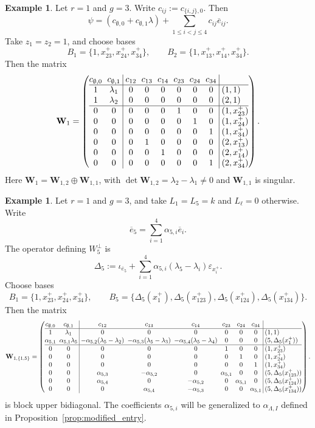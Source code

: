 \documentclass[12pt, letterpaper]{amsart}
\theoremstyle{definition}
\newtheorem{example}[theorem]{Example}
\newcommand{\bW}{\mathbf{W} }
\newcommand{\lbd}{\lambda}
\begin{document}
\begin{example}\label{ex:matrix_rank1_genus3}
Let \(r=1\) and \(g=3\). Write \(c_{ij}:=c_{\{i,j\},0}\). Then
\[\psi=(c_{\emptyset,0}+c_{\emptyset,1}\lbd)+\sum_{1\le i<j\le4}c_{ij}\overline e_{ij}.\]
Take \(z_1=z_2=1\), and choose bases
\[B_1=\{1,x_{23}^+,x_{24}^+,x_{34}^+\}, \qquad B_2=\{1,x_{13}^+,x_{14}^+,x_{34}^+\}.\]
Then the matrix
\[
\setlength{\arraycolsep}{3pt} \bW_1= \left( \begin{array}{@{}cc|cccccc|l@{}}
  c_{\emptyset,0}&c_{\emptyset,1}&c_{12}&c_{13}&c_{14}&c_{23}&c_{24}&c_{34}\\
  \hline 1&\lbd_1&0&0&0&0&0&0&(1,1)\\
  1&\lbd_2&0&0&0&0&0&0&(2,1)\\
  \hline 0&0&0&0&0&1&0&0&(1,x_{23}^+)\\
  0&0&0&0&0&0&1&0&(1,x_{24}^+)\\
  0&0&0&0&0&0&0&1&(1,x_{34}^+)\\
  0&0&0&1&0&0&0&0&(2,x_{13}^+)\\
  0&0&0&0&1&0&0&0&(2,x_{14}^+)\\
  0&0&0&0&0&0&0&1&(2,x_{34}^+)
\end{array}\right).
\]
Here \(\bW_1=\bW_{1,2}\oplus\bW_{1,1}\), with \(\det\bW_{1,2}=\lbd_2-\lbd_1\ne0\) and \(\bW_{1,1}\) is singular.
\end{example}

\begin{example}\label{ex:matrix_rank1_genus3_mixed}
Let \(r=1\) and \(g=3\), and take \(L_1=L_5=k\) and \(L_\ell=0\) otherwise. Write
\[\overline e_5=\sum_{i=1}^4\alpha_{5,i}\overline e_i.\]
The operator defining \(W_5^\perp\) is
\[\Delta_5:=\iota_{\overline e_5} +\sum_{i=1}^4 \alpha_{5,i}(\lbd_5-\lbd_i)\varepsilon_{x_i^+}.\]
Choose bases
\[B_1=\{1,x_{23}^+,x_{24}^+,x_{34}^+\},\qquad B_5=\{\Delta_5(x_1^+),\Delta_5(x_{123}^+),\Delta_5(x_{124}^+),\Delta_5(x_{134}^+)\}.\]
Then the matrix
\[
\setlength{\arraycolsep}{2.5pt} \bW_{1,\{1,5\}}=\left(\begin{array}{@{}cc|cccccc|l@{}}
  c_{\emptyset,0}&c_{\emptyset,1}&c_{12}&c_{13}&c_{14}&c_{23}&c_{24}&c_{34}\\
  \hline 1&\lbd_1&0&0&0&0&0&0&(1,1)\\
  \alpha_{5,1}&\alpha_{5,1}\lbd_5&-\alpha_{5,2}(\lbd_5-\lbd_2)&-\alpha_{5,3}(\lbd_5-\lbd_3)&-\alpha_{5,4}(\lbd_5-\lbd_4)&0&0&0&(5,\Delta_5(x_1^+))\\
  \hline 0&0&0&0&0&1&0&0&(1,x_{23}^+)\\
  0&0&0&0&0&0&1&0&(1,x_{24}^+)\\
  0&0&0&0&0&0&0&1&(1,x_{34}^+)\\
  0&0&\alpha_{5,3}&-\alpha_{5,2}&0&\alpha_{5,1}&0&0&(5,\Delta_5(x_{123}^+))\\
  0&0&\alpha_{5,4}&0&-\alpha_{5,2}&0&\alpha_{5,1}&0&(5,\Delta_5(x_{124}^+))\\
  0&0&0&\alpha_{5,4}&-\alpha_{5,3}&0&0&\alpha_{5,1}&(5,\Delta_5(x_{134}^+))
\end{array}\right).
\]
is block upper bidiagonal. The coefficients \(\alpha_{5,i}\) will be generalized to \(\alpha_{\Lambda,I}\) defined in Proposition~\ref{prop:modified_entry}.
\end{example}
\end{document}
